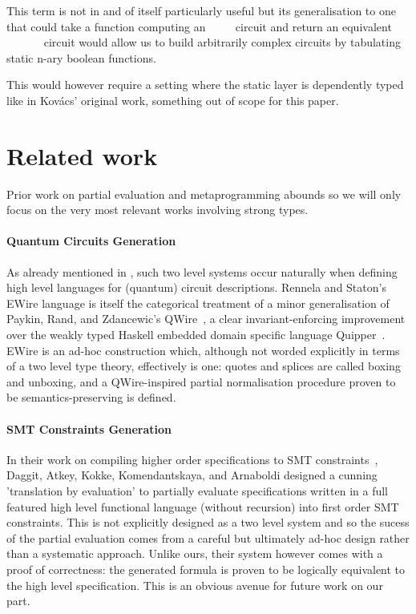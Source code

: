 This term is not in and of itself particularly useful but its
generalisation to one that could take a function computing an
{~~~~} circuit and return an
equivalent {~~\AF{+}~~~~}
circuit would allow us to build arbitrarily complex circuits
by tabulating static n-ary boolean functions.

This would however require a setting where the static layer is
dependently typed like in Kov{\'{a}}cs' original work, something
out of scope for this paper.

\section{Related work}

Prior work on partial evaluation and metaprogramming
abounds so we will only focus on the very most relevant
works involving strong types.

\paragraph{Quantum Circuits Generation}
As already mentioned in , such two level
systems occur naturally when defining high level languages
for (quantum) circuit descriptions.
%
Rennela and Staton's EWire language is itself the categorical
treatment of a minor generalisation of Paykin, Rand,
and Zdancewic's QWire~\cite{DBLP:conf/popl/Paykin0Z17},
a clear invariant-enforcing improvement over the weakly
typed Haskell embedded domain specific language Quipper~\cite{DBLP:conf/rc/GreenLRSV13}.
%
EWire is an ad-hoc construction which, although not worded
explicitly in terms of a two level type theory, effectively
is one: quotes and splices are called boxing and unboxing,
and a QWire-inspired partial normalisation procedure
proven to be semantics-preserving is defined.

\paragraph{SMT Constraints Generation}
In their work on compiling higher order specifications to SMT
constraints~\cite{DBLP:conf/cpp/DaggittAKKA23},
Daggit, Atkey, Kokke, Komendantskaya, and Arnaboldi
designed a cunning 'translation by evaluation' to
partially evaluate specifications written in a full featured
high level functional language (without recursion)
into first order SMT constraints.
%
This is not explicitly designed as a two level system and
so the sucess of the partial evaluation comes from a careful
but ultimately ad-hoc design rather than a systematic approach.
%
Unlike ours, their system however comes with a proof of
correctness: the generated formula is proven to be logically
equivalent to the high level specification.
%
This is an obvious avenue for future work on our part.

